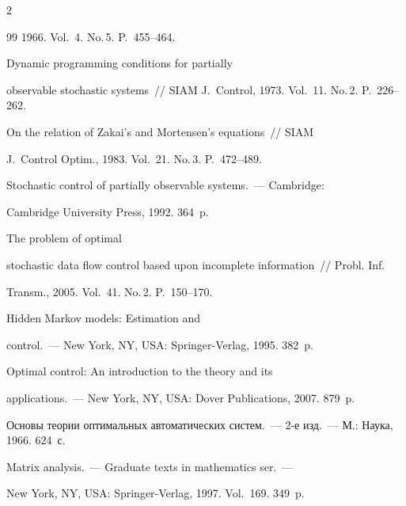 \begin{multicols}{2}
{{\begin{thebibliography}{99}
1966. Vol.~4. No.\,5. P.~455--464.







 Dynamic programming conditions for partially 


observable stochastic systems~// SIAM J.~Control, 1973. Vol.~11. No.\,2. P.~226--262.




 On the relation of Zakai's and Mortensen's equations~// SIAM 


J.~Control Optim., 1983. Vol.~21. No.\,3. P.~472--489.




 Stochastic control of partially observable systems.~--- Cambridge: 


Cambridge University Press, 1992. 364~p.







 The problem of optimal 


stochastic data flow control based upon incomplete information~// Probl. Inf. 


Transm., 2005. Vol.~41. No.\,2. P.~150--170.




 Hidden Markov models: Estimation and  


control.~--- New York, NY, USA: Springer-Verlag, 1995. 382~p.




 Optimal control: An introduction to the theory and its 


applications.~--- New York, NY, USA: Dover Publications, 2007. 879~p.




 Основы теории оптимальных автоматических сис\-тем.~--- 2-е изд.~--- М.: Наука, 1966. 624~с.




 Matrix analysis.~--- Graduate texts in mathematics ser.~--- 


New York, NY, USA: Springer-Verlag,  1997. Vol.~169. 349~p.



\end{thebibliography}}}
\end{multicols}
